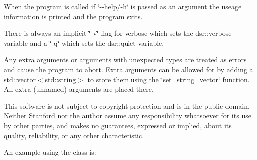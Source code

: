 When the program is called if \char`\"{}-\/-\/help/-\/h\char`\"{} is passed as an argument the useage information is printed and the program exits.

There is always an implicit \char`\"{}-\/v\char`\"{} flag for verbose which sets the dsr::verbose variable and a \char`\"{}-\/q\char`\"{} which sets the dsr::quiet variable.

Any extra arguments or arguments with unexpected types are treated as errors and cause the program to abort. Extra arguments can be allowed for by adding a std::vector$<$std::string$>$ to store them using the \char`\"{}set\_\-string\_\-vector\char`\"{} function. All extra (unnamed) arguments are placed there.

This software is not subject to copyright protection and is in the public domain. Neither Stanford nor the author assume any responsibility whatsoever for its use by other parties, and makes no guarantees, expressed or implied, about its quality, reliability, or any other characteristic.

An example using the class is: 
\begin{DoxyCodeInclude}
\end{DoxyCodeInclude}
 